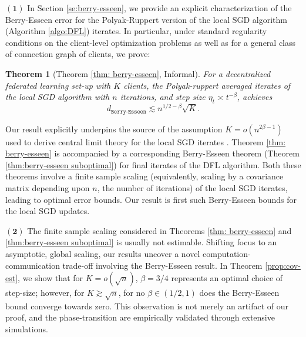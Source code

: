 \documentclass[a4paper,11pt]{article}
\numberwithin{equation}{section}
\theoremstyle{plain}
\newtheorem{theorem}{Theorem}[section]
\theoremstyle{remark}
\begin{document}
    \noindent $\mathbf{(1)}$ In Section \ref{se:berry-esseen}, we provide an explicit characterization of the Berry-Esseen error for the Polyak-Ruppert version of the local SGD algorithm (Algorithm \ref{algo:DFL}) iterates. In particular, under standard regularity conditions on the client-level optimization problems as well as for a general class of connection graph of clients, we prove:
    \begin{theorem}[Theorem \ref{thm: berry-esseen}, Informal]
        For a decentralized federated learning set-up with $K$ clients, the Polyak-ruppert averaged iterates of the  local SGD algorithm with $n$ iterations, and step size $\eta_t \asymp t^{-\beta}$, achieves 
        \[ d_{\texttt{Berry-Esseen}}\lesssim n^{1/2 - \beta}\sqrt{K}. \]
    \end{theorem}
    Our result explicitly underpins the source of the assumption $K=o(n^{2\beta-1})$ used to derive central limit theory for the local SGD iterates \cite{songxichen2024}. Theorem \ref{thm: berry-esseen} is accompanied by a corresponding Berry-Esseen theorem (Theorem \ref{thm:berry-esseen suboptimal}) for final iterates of the DFL algorithm.  Both these theorems involve a finite sample scaling (equivalently, scaling by a covariance matrix depending upon $n$, the number of iterations) of the local SGD iterates, leading to optimal error bounds. Our result is first such Berry-Esseen bounds for the local SGD updates.
    
    \noindent $\mathbf{(2)}$ The finite sample scaling considered in Theorems \ref{thm: berry-esseen} and \ref{thm:berry-esseen suboptimal} is usually not estimable. Shifting focus to an asymptotic, global scaling, our results uncover a novel computation-communication trade-off involving the Berry-Esseen result. In Theorem \ref{prop:cov-est}, we show that for $K=o(\sqrt{n})$, $\beta=3/4$ represents an optimal choice of step-size; however, for $K \gtrsim \sqrt{n}$, for no $\beta \in (1/2,1)$ does the Berry-Esseen bound converge towards zero. This observation is not merely an artifact of our proof, and the phase-transition are empirically validated through extensive simulations.
    
\end{document}

